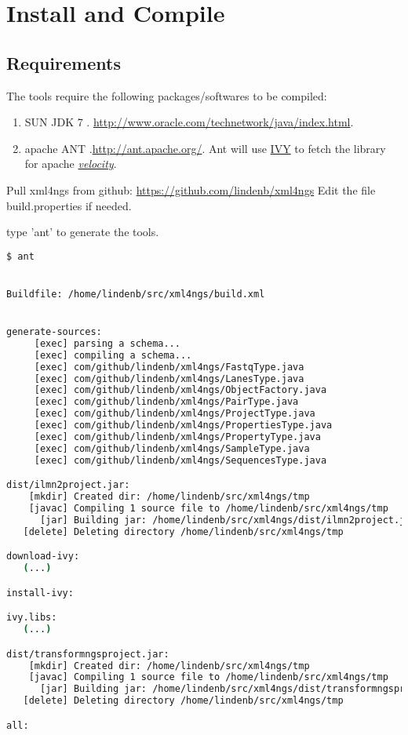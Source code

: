 \documentclass{article}
\newcommand{\velocity}{\href{http://velocity.apache.org/}{\em{velocity}}}
\begin{document}
\section{Install and Compile}

\subsection{Requirements}
The tools require the following packages/softwares to be compiled:
\begin{enumerate}
\item SUN JDK 7 . \url{http://www.oracle.com/technetwork/java/index.html}.
\item apache ANT .\url{http://ant.apache.org/}. Ant will use \href{http://ant.apache.org/ivy/}{IVY} to fetch the library for apache \velocity{}.
\end{enumerate}

Pull xml4ngs from github: \url{https://github.com/lindenb/xml4ngs}
Edit the file build.properties if needed.

type 'ant' to generate the tools.
\begin{lstlisting}[language=bash]
$ ant


Buildfile: /home/lindenb/src/xml4ngs/build.xml


generate-sources:
     [exec] parsing a schema...
     [exec] compiling a schema...
     [exec] com/github/lindenb/xml4ngs/FastqType.java
     [exec] com/github/lindenb/xml4ngs/LanesType.java
     [exec] com/github/lindenb/xml4ngs/ObjectFactory.java
     [exec] com/github/lindenb/xml4ngs/PairType.java
     [exec] com/github/lindenb/xml4ngs/ProjectType.java
     [exec] com/github/lindenb/xml4ngs/PropertiesType.java
     [exec] com/github/lindenb/xml4ngs/PropertyType.java
     [exec] com/github/lindenb/xml4ngs/SampleType.java
     [exec] com/github/lindenb/xml4ngs/SequencesType.java

dist/ilmn2project.jar:
    [mkdir] Created dir: /home/lindenb/src/xml4ngs/tmp
    [javac] Compiling 1 source file to /home/lindenb/src/xml4ngs/tmp
      [jar] Building jar: /home/lindenb/src/xml4ngs/dist/ilmn2project.jar
   [delete] Deleting directory /home/lindenb/src/xml4ngs/tmp

download-ivy:
   (...)

install-ivy:

ivy.libs:
   (...)

dist/transformngsproject.jar:
    [mkdir] Created dir: /home/lindenb/src/xml4ngs/tmp
    [javac] Compiling 1 source file to /home/lindenb/src/xml4ngs/tmp
      [jar] Building jar: /home/lindenb/src/xml4ngs/dist/transformngsproject.jar
   [delete] Deleting directory /home/lindenb/src/xml4ngs/tmp

all:


\end{lstlisting}
\end{document}
